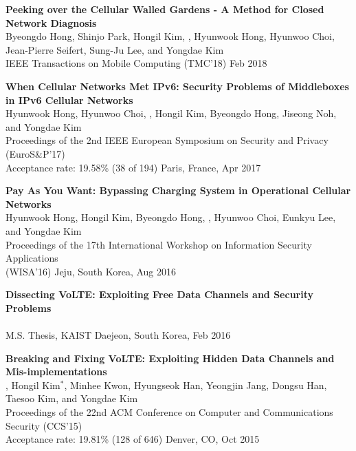 \begin{enumerate}[label={[\arabic*]}, leftmargin=1.5em]
    \item \textbf{Peeking over the Cellular Walled Gardens - A Method for Closed Network Diagnosis} \\
        {\small
            Byeongdo Hong, Shinjo Park, Hongil Kim, , Hyunwook Hong, Hyunwoo Choi, Jean-Pierre Seifert, Sung-Ju Lee, and Yongdae Kim \\
            IEEE Transactions on Mobile Computing (TMC'18)
        }
        \hfill {\small Feb 2018}

    \item \textbf{When Cellular Networks Met IPv6: Security Problems of Middleboxes in IPv6 Cellular Networks} \\
        {\small
            Hyunwook Hong, Hyunwoo Choi, , Hongil Kim, Byeongdo Hong, Jiseong Noh, and Yongdae Kim \\
            Proceedings of the 2nd IEEE European Symposium on Security and Privacy (EuroS\&P'17)\\
            Acceptance rate: 19.58\% (38 of 194)
        }
        \hfill {\small Paris, France, Apr 2017}

    \item \textbf{Pay As You Want: Bypassing Charging System in Operational Cellular Networks} \\
        {\small
            Hyunwook Hong, Hongil Kim, Byeongdo Hong, , Hyunwoo Choi, Eunkyu Lee, and Yongdae Kim \\
            Proceedings of the 17th International Workshop on Information Security Applications \\ (WISA'16)
        }
        \hfill {\small Jeju, South Korea, Aug 2016}

    \item \textbf{Dissecting VoLTE: Exploiting Free Data Channels and Security Problems} \\
        {\small
             \\
            M.S. Thesis, KAIST
        }
        \hfill {\small Daejeon, South Korea, Feb 2016}

    \item \textbf{Breaking and Fixing VoLTE: Exploiting Hidden Data Channels and Mis-implementations} \\
        {\small
            , Hongil Kim$^\ast$, Minhee Kwon, Hyungseok Han, Yeongjin Jang, Dongsu Han, Taesoo Kim, and Yongdae Kim \\
            Proceedings of the 22nd ACM Conference on Computer and Communications Security (CCS'15) \\
            Acceptance rate: 19.81\% (128 of 646)
        }
        \hfill {\small Denver, CO, Oct 2015}


\end{enumerate}
